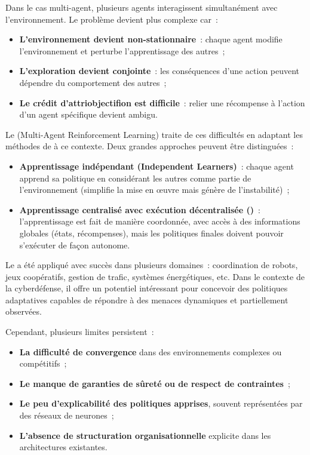 Dans le cas multi-agent, plusieurs agents interagissent simultanément avec l'environnement. Le problème devient plus complexe car~:
\begin{itemize}
  \item \textbf{L'environnement devient non-stationnaire}~: chaque agent modifie l'environnement et perturbe l'apprentissage des autres~;
  \item \textbf{L'exploration devient conjointe}~: les conséquences d'une action peuvent dépendre du comportement des autres~;
  \item \textbf{Le crédit d'attriobjectifion est difficile}~: relier une récompense à l'action d'un agent spécifique devient ambigu.
\end{itemize}

Le  (Multi-Agent Reinforcement Learning) traite de ces difficultés en adaptant les méthodes de  à ce contexte. Deux grandes approches peuvent être distinguées~:
\begin{itemize}
  \item \textbf{Apprentissage indépendant (Independent Learners)}~: chaque agent apprend sa politique en considérant les autres comme partie de l'environnement (simplifie la mise en œuvre mais génère de l'instabilité)~;
  \item \textbf{Apprentissage centralisé avec exécution décentralisée ()}~: l'apprentissage est fait de manière coordonnée, avec accès à des informations globales (états, récompenses), mais les politiques finales doivent pouvoir s'exécuter de façon autonome.
\end{itemize}


Le  a été appliqué avec succès dans plusieurs domaines~: coordination de robots, jeux coopératifs, gestion de trafic, systèmes énergétiques, etc. Dans le contexte de la cyberdéfense, il offre un potentiel intéressant pour concevoir des politiques adaptatives capables de répondre à des menaces dynamiques et partiellement observées.

Cependant, plusieurs limites persistent~:
\begin{itemize}
  \item \textbf{La difficulté de convergence} dans des environnements complexes ou compétitifs~;
  \item \textbf{Le manque de garanties de sûreté ou de respect de contraintes}~;
  \item \textbf{Le peu d'explicabilité des politiques apprises}, souvent représentées par des réseaux de neurones~;
  \item \textbf{L'absence de structuration organisationnelle} explicite dans les architectures existantes.
\end{itemize}

